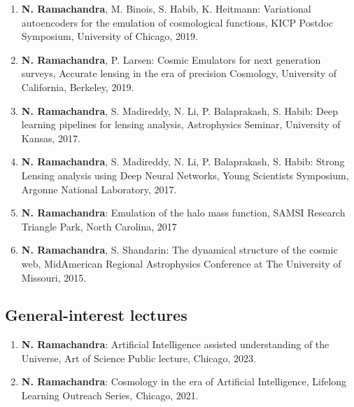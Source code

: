 \documentclass[letterpaper]{article}
\begin{document}
\begin{enumerate}
\item \textbf{N. Ramachandra}, M. Binois, S. Habib, K. Heitmann: Variational autoencoders for the emulation of cosmological functions, KICP Postdoc Symposium, University of Chicago, 2019. 

\item \textbf{N. Ramachandra}, P. Larsen: Cosmic Emulators for next generation surveys, Accurate lensing in the era of precision Cosmology, University of California, Berkeley, 2019. 

\item \textbf{N. Ramachandra}, S. Madireddy, N. Li, P. Balaprakash, S. Habib: Deep learning pipelines for lensing analysis, Astrophysics Seminar, University of Kansas, 2017.

\item \textbf{N. Ramachandra}, S. Madireddy, N. Li, P. Balaprakash, S. Habib: Strong Lensing analysis using Deep Neural Networks, Young Scientists Symposium, Argonne National Laboratory, 2017. 

\item \textbf{N. Ramachandra}: Emulation of the halo mass function, SAMSI Research Triangle Park, North Carolina, 2017

\item \textbf{N. Ramachandra}, S. Shandarin: The dynamical structure of the cosmic web, MidAmerican Regional Astrophysics Conference at The University of Missouri, 2015.

\end{enumerate}


\subsection*{General-interest lectures}

\begin{enumerate}

\item \textbf{N. Ramachandra}: Artificial Intelligence assisted understanding of the Universe, Art of Science Public lecture, Chicago, 2023.

\item \textbf{N. Ramachandra}: Cosmology in the era of Artificial Intelligence, Lifelong Learning Outreach Series, Chicago, 2021. 

\end{enumerate}
\end{document}

